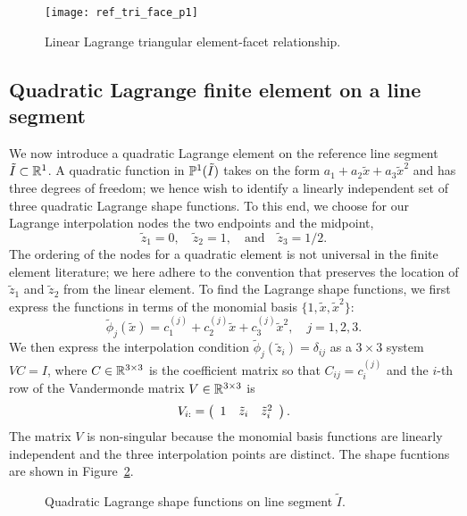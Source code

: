 \begin{figure}
  \centering
  \texttt{[image: ref\_tri\_face\_p1]}
  \caption{Linear Lagrange triangular element-facet relationship.}
  \label{fig:fe_ref_tri_face_p1}
\end{figure}



\subsection{Quadratic Lagrange finite element on a line segment}
\label{sec:fe_p2_line}
We now introduce a quadratic Lagrange element on the reference line segment $\tilde I \subset \RR^1$. A quadratic function in $\PP^1(\tilde I)$ takes on the form $a_1 + a_2 \tilde x + a_3 \tilde x^2$ and has three degrees of freedom; we hence wish to identify a linearly independent set of three quadratic Lagrange shape functions. To this end, we choose for our Lagrange interpolation nodes the two endpoints and the midpoint,
\begin{equation*}
  \tilde z_1 = 0, \quad \tilde z_2 = 1, \quad \text{and} \quad \tilde z_3 = 1/2. 
\end{equation*}
The ordering of the nodes for a quadratic element is not universal in the finite element literature; we here adhere to the convention that preserves the location of $\tilde z_1$ and $\tilde z_2$ from the linear element.  To find the Lagrange shape functions, we first express the functions in terms of the monomial basis $\{ 1, \tilde x, \tilde x^2 \}$:
\begin{equation}
  \tilde \phi_j(\tilde x) = c_1^{(j)} + c_2^{(j)} \tilde x + c_3^{(j)} \tilde x^2, \quad j = 1,2, 3.
  \label{eq:fe_quad_line_rep}
\end{equation}
We then express the interpolation condition $\tilde \phi_j(\tilde z_i) = \delta_{ij}$ as a $3 \times 3$ system $VC = I$, where $C \in \RR^{3 \times 3}$ is the coefficient matrix so that $C_{ij} = c_i^{(j)}$ and the $i$-th row of the Vandermonde matrix $V \in \RR^{3 \times 3}$ is
\begin{equation*}
  V_{i:} = \bmat{ccc} 1 & \tilde z_i & \tilde z_i^2\emat.
\end{equation*}
The matrix $V$ is non-singular because the monomial basis functions are linearly independent and the three interpolation points are distinct. The shape fucntions are shown in Figure~\ref{fig:fe_shape_line_p2}. 
\begin{figure}
  \centering
  \caption{Quadratic Lagrange shape functions on line segment $\tilde I$. \label{fig:fe_shape_line_p2}}
\end{figure}
